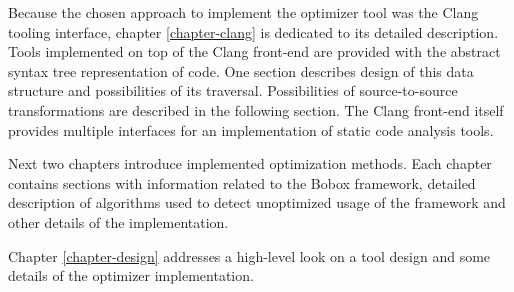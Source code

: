 Because the chosen approach to implement the optimizer tool was the Clang tooling interface, chapter \ref{chapter-clang} is dedicated to its detailed description. Tools implemented on top of the Clang front-end are provided with the abstract syntax tree representation of code. One section describes design of this data structure and possibilities of its traversal. Possibilities of source-to-source transformations are described in the following section. The Clang front-end itself provides multiple interfaces for an implementation of static code analysis tools.

Next two chapters introduce implemented optimization methods. Each chapter contains sections with information related to the Bobox framework, detailed description of algorithms used to detect unoptimized usage of the framework and other details of the implementation.

Chapter \ref{chapter-design} addresses a high-level look on a tool design and some details of the optimizer implementation.